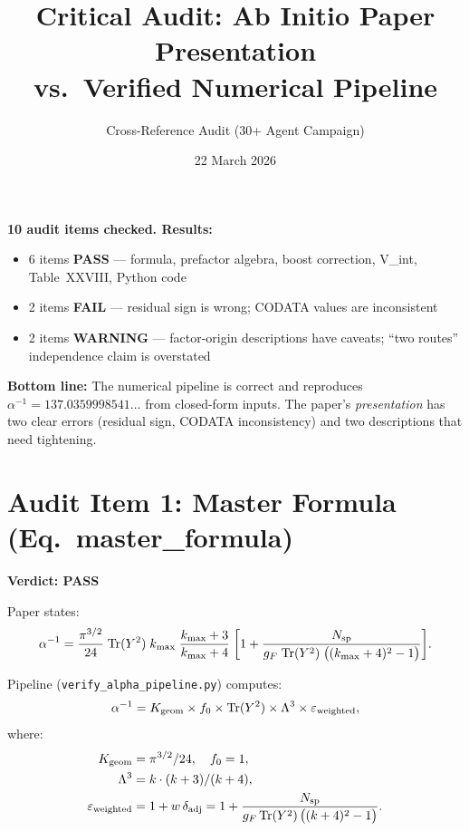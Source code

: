 \documentclass[11pt]{article}
\title{Critical Audit: Ab Initio Paper Presentation\\
  vs.\ Verified Numerical Pipeline}
\author{Cross-Reference Audit (30+ Agent Campaign)}
\date{22 March 2026}
\newcommand{\PASS}{\textcolor{pass}{\textbf{PASS}}}
\newcommand{\FAIL}{\textcolor{fail}{\textbf{FAIL}}}
\newcommand{\WARN}{\textcolor{warn}{\textbf{WARNING}}}
\begin{document}
\maketitle

\begin{tcolorbox}[colback=blue!5!white, colframe=blue!50!black, title=Executive Summary]
\textbf{10 audit items checked. Results:}
\begin{itemize}
\item 6 items \PASS{} --- formula, prefactor algebra, boost correction, V\_int,
  Table~XXVIII, Python code
\item 2 items \FAIL{} --- residual sign is wrong; CODATA values are inconsistent
\item 2 items \WARN{} --- factor-origin descriptions have caveats;
  ``two routes'' independence claim is overstated
\end{itemize}

\textbf{Bottom line:} The numerical pipeline is correct and reproduces
$\alpha^{-1} = 137.0359998541\ldots$ from closed-form inputs.
The paper's \emph{presentation} has two clear errors (residual sign, CODATA
inconsistency) and two descriptions that need tightening.
\end{tcolorbox}

\section{Audit Item 1: Master Formula (Eq.\ master\_formula)}

\textbf{Verdict: \PASS}

\medskip
\noindent Paper states:
\begin{equation}\label{eq:master}
\alpha^{-1} = \frac{\pi^{3/2}}{24}\;\mathrm{Tr}(Y^2)\;k_{\max}\;
  \frac{k_{\max}+3}{k_{\max}+4}\;
  \biggl[1 + \frac{N_{\rm sp}}{g_F\;\mathrm{Tr}(Y^2)\;\bigl((k_{\max}+4)^2-1\bigr)}\biggr].
\end{equation}

Pipeline (\texttt{verify\_alpha\_pipeline.py}) computes:
\[
\alpha^{-1} = K_{\rm geom} \times f_0 \times \mathrm{Tr}(Y^2)
  \times \Lambda^3 \times \varepsilon_{\rm weighted},
\]
where:
\begin{align}
K_{\rm geom} &= \pi^{3/2}/24, \quad f_0 = 1, \\
\Lambda^3 &= k \cdot (k+3)/(k+4), \\
\varepsilon_{\rm weighted} &= 1 + w\,\delta_{\rm adj}
  = 1 + \frac{N_{\rm sp}}{g_F\,\mathrm{Tr}(Y^2)\,\bigl((k+4)^2-1\bigr)}.
\end{align}
\end{document}
